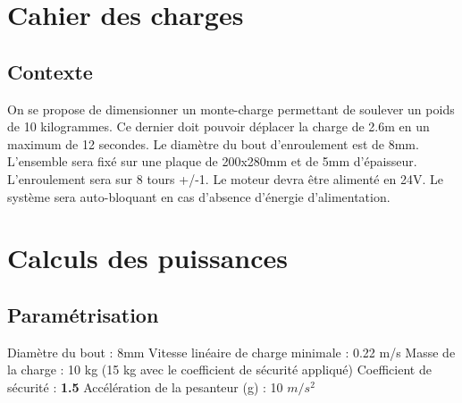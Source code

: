 \tableofcontents
	
\chapter{Cahier des charges}

\section{Contexte}
On se propose de dimensionner un monte-charge permettant de soulever un poids de 10 kilogrammes.\newline
Ce dernier doit pouvoir déplacer la charge de 2.6m  en un maximum de 12 secondes.\newline
Le diamètre du bout d'enroulement est de 8mm. \newline
L'ensemble sera fixé sur une plaque de 200x280mm et de 5mm d'épaisseur.\newline
L'enroulement sera sur 8 tours +/-1.\newline
Le moteur devra être alimenté en 24V.\newline
Le système sera auto-bloquant en cas d'absence d'énergie d'alimentation.\newline

\endgroup%


\chapter{Calculs des puissances}


\section{Paramétrisation}

Diamètre du bout : 8mm \newline
Vitesse linéaire de charge minimale : 0.22 m/s \newline
Masse de la charge : 10 kg (15 kg avec le coefficient de sécurité appliqué) \newline
Coefficient de sécurité : \textbf{1.5} \newline
Accélération de la pesanteur (g) : 10 $m/s^2$
\sskip


